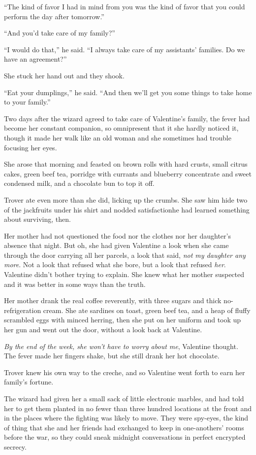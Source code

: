 “The kind of favor I had in mind from you was the kind of favor
that you could perform the day after tomorrow.”

“And you’d take care of my family?”

“I would do that,” he said. “I always take care of my assistants’
families. Do we have an agreement?”

She stuck her hand out and they shook.

“Eat your dumplings,” he said. “And then we’ll get you some things
to take home to your family.”

\tb

Two days after the wizard agreed to take care of Va\-len\-tine’s
family, the fever had become her constant companion, so omnipresent
that it she hardly noticed it, though it made her walk like an old
woman and she sometimes had trouble focusing her eyes.

She arose that morning and feasted on brown rolls with hard crusts,
small citrus cakes, green beef tea, porridge with currants and
blueberry concentrate and sweet condensed milk, and a chocolate bun
to top it off.

Trover ate even more than she did, licking up the crumbs. She saw
him hide two of the jackfruits under his shirt and nodded
satisfaction\dash{}he had learned something about surviving, then.

Her mother had not questioned the food nor the clothes nor her
daughter’s absence that night. But oh, she had given Valentine a
look when she came through the door carrying all her parcels, a
look that said, \emph{not my daughter any more}. Not a look that
refused what she bore, but a look that refused \emph{her}.
Valentine didn’t bother trying to explain. She knew what her mother
suspected and it was better in some ways than the truth.

Her mother drank the real coffee reverently, with three sugars and
thick no-refrigeration cream. She ate sardines on toast, green beef
tea, and a heap of fluffy scrambled eggs with minced herring, then
she put on her uniform and took up her gun and went out the door,
without a look back at Valentine.

\emph{By the end of the week, she won’t have to worry about me},
Valentine thought. The fever made her fingers shake, but she still
drank her hot chocolate.

Trover knew his own way to the creche, and so Valentine went forth
to earn her family’s fortune.

The wizard had given her a small sack of little electronic marbles,
and had told her to get them planted in no fewer than three hundred
locations at the front and in the places where the fighting was
likely to move. They were spy-eyes, the kind of thing that she and
her friends had exchanged to keep in one-anothers’ rooms before the
war, so they could sneak midnight conversations in perfect
encrypted secrecy.


